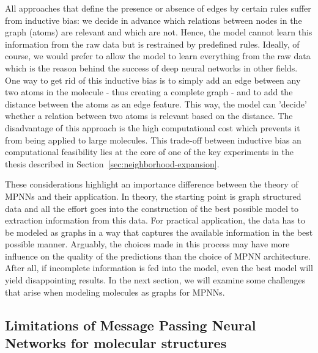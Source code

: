 All approaches that define the presence or absence of edges by certain rules suffer from inductive bias: we decide in advance which relations between nodes in the graph (atoms) are relevant and which are not. Hence, the model cannot learn this information from the raw data but is restrained by predefined rules. Ideally, of course, we would prefer to allow the model to learn everything from the raw data which is the reason behind the success of deep neural networks in other fields. One way to get rid of this inductive bias is to simply add an edge between any two atoms in the molecule - thus creating a complete graph - and to add the distance between the atoms as an edge feature. This way, the model can 'decide' whether a relation between two atoms is relevant based on the distance. The disadvantage of this approach is the high computational cost which prevents it from being applied to large molecules. This trade-off between inductive bias an computational feasibility lies at the core of one of the key experiments in the thesis described in Section~\ref{sec:neighborhood-expansion}.

%

These considerations highlight an importance difference between the theory of MPNNs and their application. In theory, the starting point is graph structured data and all the effort goes into the construction of the best possible model to extraction information from this data. For practical application, the data has to be modeled as graphs in a way that captures the available information in the best possible manner. Arguably, the choices made in this process may have more influence on the quality of the predictions than the choice of MPNN architecture. After all, if incomplete information is fed into the model, even the best model will yield disappointing results. In the next section, we will examine some challenges that arise when modeling molecules as graphs for MPNNs.


\subsection{Limitations of Message Passing Neural Networks for molecular structures}
\label{sec:limitations}

